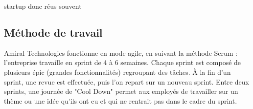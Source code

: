 startup donc réus souvent


\subsection{Méthode de travail}
Amiral Technologies fonctionne en mode agile, en suivant la méthode Scrum : l’entreprise travaille en sprint de 4 à 6 semaines.
Chaque sprint est composé de plusieurs épic (grandes fonctionnalités) regroupant des tâches.
À la fin d’un sprint, une revue est effectuée, puis l’on repart sur un nouveau sprint.
Entre deux sprints, une journée de "Cool Down" permet aux employés de travailler sur un thème ou une idée qu’ils ont eu et qui ne rentrait pas
dans le cadre du sprint.